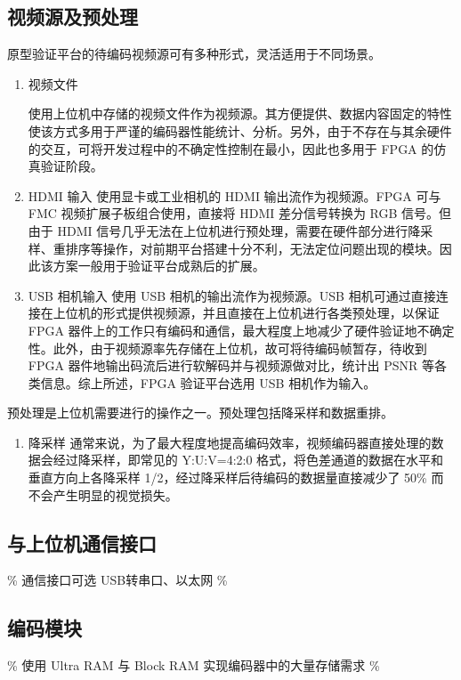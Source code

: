 \subsection{视频源及预处理}
原型验证平台的待编码视频源可有多种形式，灵活适用于不同场景。
\begin{enumerate}
    \item 视频文件
    
    使用上位机中存储的视频文件作为视频源。其方便提供、数据内容固定的特性使该方式多用于严谨的编码器性能统计、分析。另外，由于不存在与其余硬件的交互，可将开发过程中的不确定性控制在最小，因此也多用于 FPGA 的仿真验证阶段。

    \item HDMI 输入
    使用显卡或工业相机的 HDMI 输出流作为视频源。FPGA 可与 FMC 视频扩展子板组合使用，直接将 HDMI 差分信号转换为 RGB 信号。但由于 HDMI 信号几乎无法在上位机进行预处理，需要在硬件部分进行降采样、重排序等操作，对前期平台搭建十分不利，无法定位问题出现的模块。因此该方案一般用于验证平台成熟后的扩展。

    \item USB 相机输入
    使用 USB 相机的输出流作为视频源。USB 相机可通过直接连接在上位机的形式提供视频源，并且直接在上位机进行各类预处理，以保证 FPGA 器件上的工作只有编码和通信，最大程度上地减少了硬件验证地不确定性。此外，由于视频源率先存储在上位机，故可将待编码帧暂存，待收到 FPGA 器件地输出码流后进行软解码并与视频源做对比，统计出 PSNR 等各类信息。综上所述，FPGA 验证平台选用 USB 相机作为输入。
\end{enumerate}

预处理是上位机需要进行的操作之一。预处理包括降采样和数据重排。
\begin{enumerate}
\item 降采样    
通常来说，为了最大程度地提高编码效率，视频编码器直接处理的数据会经过降采样，即常见的 Y:U:V=4:2:0 格式，将色差通道的数据在水平和垂直方向上各降采样 1/2，经过降采样后待编码的数据量直接减少了 50\% 而不会产生明显的视觉损失。
\end{enumerate}

\subsection{与上位机通信接口}
\% 通信接口可选 USB转串口、以太网 \%

\subsection{编码模块}
\% 使用 Ultra RAM 与 Block RAM 实现编码器中的大量存储需求 \%

